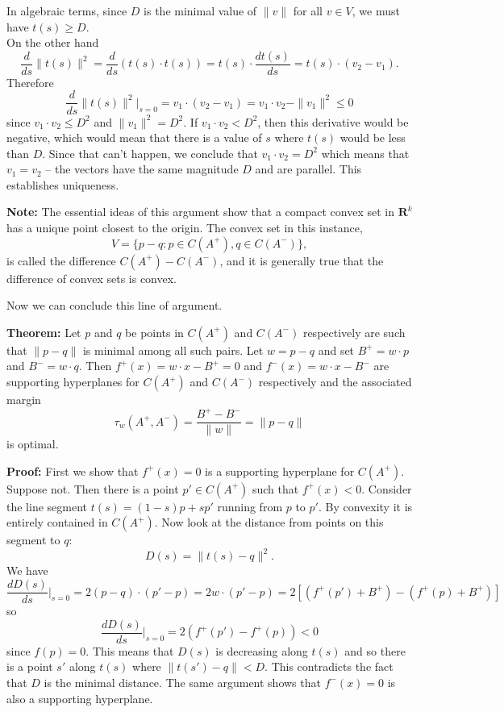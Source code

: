 \documentclass[
  oneside]{scrbook}
\begin{document}
In algebraic terms, since \(D\) is the minimal value of \(\|v\|\) for
all \(v\in V\), we must have \(t(s)\ge D\).\\
On the other hand \[
\frac{d}{ds}\|t(s)\|^2 = \frac{d}{ds}(t(s)\cdot t(s)) =t(s)\cdot \frac{dt(s)}{ds} = t(s)\cdot(v_2-v_1).
\] Therefore \[
\frac{d}{ds}\|t(s)\|^2|_{s=0} = v_{1}\cdot(v_{2}-v_{1})=v_{1}\cdot v_{2}-\|v_{1}\|^2\le 0
\] since \(v_{1}\cdot v_{2}\le D^{2}\) and \(\|v_{1}\|^2=D^2\). If
\(v_{1}\cdot v_{2}<D^{2}\), then this derivative would be negative,
which would mean that there is a value of \(s\) where \(t(s)\) would be
less than \(D\). Since that can't happen, we conclude that
\(v_{1}\cdot v_{2}=D^{2}\) which means that \(v_{1}=v_{2}\) -- the
vectors have the same magnitude \(D\) and are parallel. This establishes
uniqueness.

\textbf{Note:} The essential ideas of this argument show that a compact
convex set in \(\mathbf{R}^{k}\) has a unique point closest to the
origin. The convex set in this instance, \[
V=\{p-q:p\in C(A^{+}),q\in C(A^{-})\},
\] is called the difference \(C(A^{+})-C(A^{-})\), and it is generally
true that the difference of convex sets is convex.

Now we can conclude this line of argument.

\textbf{Theorem:} Let \(p\) and \(q\) be points in \(C(A^{+})\) and
\(C(A^{-})\) respectively are such that \(\|p-q\|\) is minimal among all
such pairs. Let \(w=p-q\) and set \(B^{+}=w\cdot p\) and
\(B^{-}=w\cdot q\). Then \(f^{+}(x)=w\cdot x-B^{+}=0\) and
\(f^{-}(x)=w\cdot x-B^{-}\) are supporting hyperplanes for \(C(A^{+})\)
and \(C(A^{-})\) respectively and the associated margin \[
\tau_{w}(A^{+},A^{-})=\frac{B^{+}-B^{-}}{\|w\|} = \|p-q\|
\] is optimal.

\textbf{Proof:} First we show that \(f^{+}(x)=0\) is a supporting
hyperplane for \(C(A^{+})\). Suppose not. Then there is a point
\(p'\in C(A^{+})\) such that \(f^{+}(x)<0\). Consider the line segment
\(t(s) = (1-s)p+sp'\) running from \(p\) to \(p'\). By convexity it is
entirely contained in \(C(A^{+})\). Now look at the distance from points
on this segment to \(q\): \[
D(s)=\|t(s)-q\|^2.
\] We have \[
\frac{dD(s)}{ds}|_{s=0} = 2(p-q)\cdot (p'-p) = 2w\cdot (p'-p) = 2\left[(f^{+}(p')+B^{+})-(f^{+}(p)+B^{+})\right]
\] so \[
\frac{dD(s)}{ds}|_{s=0} = 2(f^{+}(p')-f^{+}(p))<0
\] since \(f(p)=0\). This means that \(D(s)\) is decreasing along
\(t(s)\) and so there is a point \(s'\) along \(t(s)\) where
\(\|t(s')-q\|<D\). This contradicts the fact that \(D\) is the minimal
distance. The same argument shows that \(f^{-}(x)=0\) is also a
supporting hyperplane.
\end{document}
